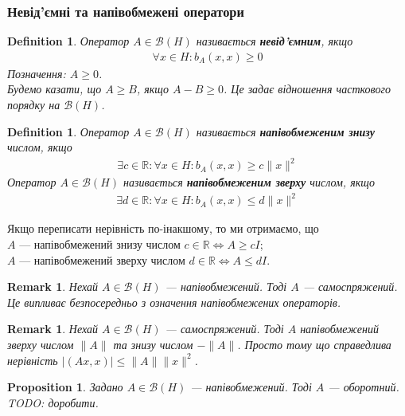 \documentclass[a4paper, 10pt]{article}
\theoremstyle{theoremdd}
\theoremstyle{theoremdd}
\newtheorem{definition}[theorem]{Definition}
\theoremstyle{theoremdd}
\theoremstyle{theoremdd}
\theoremstyle{theoremdd}
\newtheorem{proposition}[theorem]{Proposition}
\theoremstyle{theoremdd}
\newtheorem{remark}[theorem]{Remark}
\theoremstyle{theoremdd}
\theoremstyle{theoremdd}
\begin{document}
\subsubsection{Невід'ємні та напівобмежені оператори}
\begin{definition}
Оператор $A \in \mathcal{B}(H)$ називається \textbf{невід'ємним}, якщо
\begin{align*}
\forall x \in H: b_A(x,x) \geq 0
\end{align*}
Позначення: $A \geq 0$.\\
Будемо казати, що $A \geq B$, якщо $A-B \geq 0$. Це задає відношення часткового порядку на $\mathcal{B}(H)$.
\end{definition}

\begin{definition}
Оператор $A \in \mathcal{B}(H)$ називається \textbf{напівобмеженим знизу} числом, якщо
\begin{align*}
\exists c \in \mathbb{R}: \forall x \in H: b_A(x,x) \geq c \|x\|^2
\end{align*}
Оператор $A \in \mathcal{B}(H)$ називається \textbf{напівобмеженим зверху} числом, якщо
\begin{align*}
\exists d \in \mathbb{R}: \forall x \in H: b_A(x,x) \leq d \|x\|^2
\end{align*}
\end{definition}
\noindent
Якщо переписати нерівність по-інакшому, то ми отримаємо, що\\
$A$ --- напівобмежений знизу числом $c \in \mathbb{R} \iff A \geq c I$;\\
$A$ --- напівобмежений зверху числом $d \in \mathbb{R} \iff A \leq d I$.

\begin{remark}
Нехай $A \in \mathcal{B}(H)$ --- напівобмежений. Тоді $A$ --- самоспряжений.\\
Це випливає безпосередньо з означення напівобмежених операторів.
\end{remark}

\begin{remark}
Нехай $A \in \mathcal{B}(H)$ --- самоспряжений. Тоді $A$ напівобмежений зверху числом $\|A\|$ та знизу числом $-\|A\|$. Просто тому що справедлива нерівність $|(Ax,x)| \leq \|A\| \|x\|^2$.
\end{remark}

\begin{proposition}
Задано $A \in \mathcal{B}(H)$ --- напівобмежений. Тоді $A$ --- оборотний.\\
\textit{TODO: доробити.}
\end{proposition}
\end{document}
